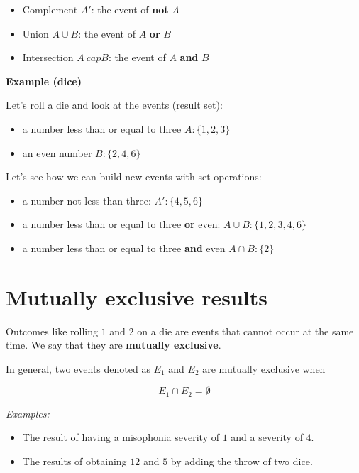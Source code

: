 \documentclass[
]{book}
\providecommand{\tightlist}{%
  \setlength{\itemsep}{0pt}\setlength{\parskip}{0pt}}
\begin{document}
\begin{itemize}
\tightlist
\item
  Complement \(A'\): the event of \textbf{not} \(A\)
\item
  Union \(A \cup B\): the event of \(A\) \textbf{or} \(B\)
\item
  Intersection \(A \ cap B\): the event of \(A\) \textbf{and} \(B\)
\end{itemize}

\textbf{Example (dice)}

Let's roll a die and look at the events (result set):

\begin{itemize}
\tightlist
\item
  a number less than or equal to three \(A:\{ 1,2,3\}\)
\item
  an even number \(B:\{ 2,4,6\}\)
\end{itemize}

Let's see how we can build new events with set operations:

\begin{itemize}
\tightlist
\item
  a number not less than three: \(A ':\{4,5,6\}\)
\item
  a number less than or equal to three \textbf{or} even: \(A \cup B: \{ 1,2,3,4,6\}\)
\item
  a number less than or equal to three \textbf{and} even \(A \cap B: \{ 2\}\)
\end{itemize}

\hypertarget{mutually-exclusive-results}{%
\section{Mutually exclusive results}\label{mutually-exclusive-results}}

Outcomes like rolling \(1\) and \(2\) on a die are events that cannot occur at the same time. We say that they are \textbf{mutually exclusive}.

In general, two events denoted as \(E_1\) and \(E_2\) are mutually exclusive when

\[E_1\cap E_2=\emptyset\]

\emph{Examples:}

\begin{itemize}
\item
  The result of having a misophonia severity of \(1\) and a severity of \(4\).
\item
  The results of obtaining \(12\) and \(5\) by adding the throw of two dice.
\end{itemize}
\end{document}
